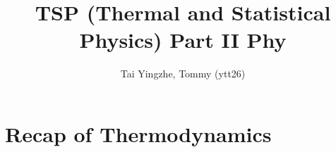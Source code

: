 \documentclass[a4paper]{article}
\title{\textbf{TSP (Thermal and Statistical Physics) Part II Phy}}
\author{Tai Yingzhe, Tommy (ytt26)}
\date{}
\theoremstyle{new}
\begin{document}
\maketitle
\tableofcontents

\newpage
\section{Recap of Thermodynamics}
\end{document}
